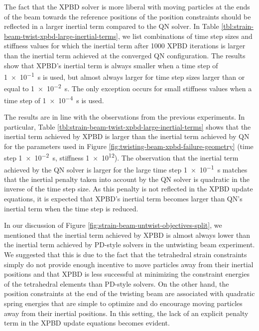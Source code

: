 The fact that the XPBD solver is more liberal with moving particles at the ends of the beam towards the reference positions of the position constraints 
should be reflected in a larger inertial term compared to the QN solver. In Table \ref{tbl:strain-beam-twist-xpbd-large-inertial-terms}, we list combinations 
of time step sizes and stiffness values for which the inertial term after 1000 XPBD iterations is larger than the inertial term achieved at the converged 
QN configuration. The results show that XPBD's inertial term is always smaller when a time step of \SI{1e-1}{\second} is used, but almost always larger for 
time step sizes larger than or equal to \SI{1e-2}{\second}. The only exception occurs for small stiffness values when a time step of \SI{1e-4}{\second} is 
used.

The results are in line with the observations from the previous experiments. In particular, Table \ref{tbl:strain-beam-twist-xpbd-large-inertial-terms} shows 
that the inertial term achieved by XPBD is larger than the inertial term achieved by QN for the parameters used in 
Figure \ref{fig:twisting-beam-xpbd-failure-geometry} (time step \SI{1e-2}{\second}, stiffness \num{1e12}). The observation that the inertial term achieved by 
the QN solver is larger for the large time step \SI{1e-1}{\second} matches that the inertial penalty taken into account by the QN solver 
is quadratic in the inverse of the time step size. As this penalty is not reflected in the XPBD update equations, it is expected 
that XPBD's inertial term becomes larger than QN's inertial term when the time step is reduced. 

In our discussion of Figure \ref{fig:strain-beam-untwist-objectives-split}, we mentioned that the inertial term achieved by 
XPBD is almost always lower than the inertial term achieved by PD-style solvers in the untwisting beam experiment. We suggested that this is due to the 
fact that the tetrahedral strain constraints simply do not provide enough incentive to move particles away from their inertial positions and that XPBD is 
less successful at minimizing the constraint energies of the tetrahedral elements than PD-style solvers. On the other hand, the position constraints at 
the end of the twisting beam are associated with quadratic spring energies that are simple to optimize and do encourage moving particles 
away from their inertial positions. In this setting, the lack of an explicit penalty term in the XPBD update equations becomes evident.

